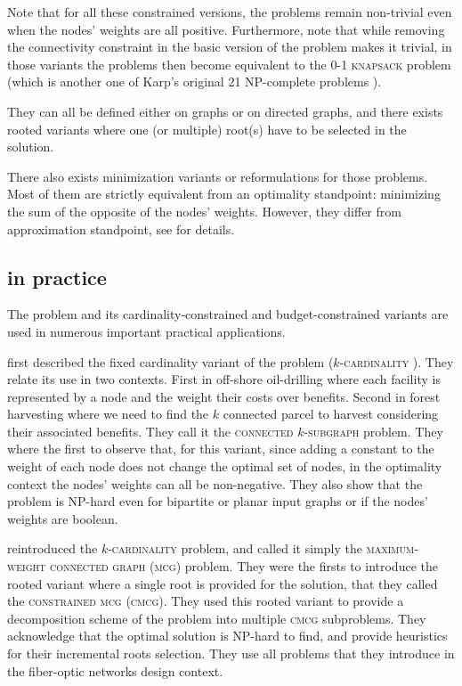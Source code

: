 	Note that for all these constrained versions, the problems remain non-trivial even when the nodes' weights are all positive.
	Furthermore, note that while removing the connectivity constraint in the basic version of the problem makes it trivial, in those variants the problems then become equivalent to the \textsc{0-1 knapsack} problem (which is another one of Karp's original 21 NP-complete problems \parencite{karp1972reducibility}).

	They can all be defined either on graphs or on directed graphs, and there exists rooted variants where one (or multiple) root(s) have to be selected in the solution.

	There also exists minimization variants or reformulations for those problems. Most of them are strictly equivalent from an optimality standpoint: minimizing the sum of the opposite of the nodes' weights.
	However, they differ from approximation standpoint, see \parencites{feigenbaum2000sharing}{johnson2000prize} for details.

	\subsection{\mwcs{} in practice}

		The \mwcs{} problem and its cardinality-constrained and budget-constrained variants are used in numerous important practical applications.

		\Textcite{hochbaum1994node} first described the fixed cardinality variant of the problem (\textsc{$k$-cardinality \mwcs{}}).
		They relate its use in two contexts.
		First in off-shore oil-drilling where each facility is represented by a node and the weight their costs over benefits.
		Second in forest harvesting where we need to find the $k$ connected parcel to harvest considering their associated benefits.
		They call it the \textsc{connected $k$-subgraph} problem.
		They where the first to observe that, for this variant, since adding a constant to the weight of each node does not change the optimal set of nodes, in the optimality context the nodes' weights can all be non-negative.
		They also show that the problem is NP-hard even for bipartite or planar input graphs or if the nodes' weights are boolean.

		\Textcite{lee1998decomposition} reintroduced the \textsc{$k$-cardinality \mwcs{}} problem, and called it simply the \textsc{maximum-weight connected graph} (\textsc{mcg}) problem.
		They were the firsts to introduce the rooted variant where a single root is provided for the solution, that they called the \textsc{constrained mcg} (\textsc{cmcg}).
		They used this rooted variant to provide a decomposition scheme of the \mwcs{} problem into multiple \textsc{cmcg} subproblems.
		They acknowledge that the optimal solution is NP-hard to find, and provide heuristics for their incremental roots selection.
		They use all problems that they introduce in the fiber-optic networks design context.

